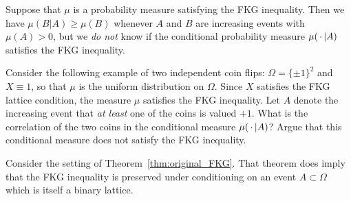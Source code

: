 \begin{remark}
    Suppose that $\mu$ is a probability measure satisfying the FKG inequality.
    Then we have $\mu(B|A)\geq\mu(B)$ whenever $A$ and $B$ are increasing events
    with $\mu(A)>0$,
    but we \emph{do not} know if the conditional probability measure $\mu(\,\cdot\,|A)$
    satisfies the FKG inequality.
\end{remark}

\begin{exercise}
    Consider the following example of two independent coin flips:
    $\Omega=\{\pm1\}^2$ and $X\equiv 1$,
    so that $\mu$ is the uniform distribution on $\Omega$.
    Since $X$ satisfies the FKG lattice condition,
    the measure $\mu$ satisfies the FKG inequality.
    Let $A$ denote the increasing event that \emph{at least}
    one of the coins is valued $+1$.
    What is the correlation of the two coins in the conditional measure
    $\mu(\,\cdot\,|A)$?
    Argue that this conditional measure does not satisfy the FKG inequality.
\end{exercise}

\begin{remark}
    Consider the setting of Theorem~\ref{thm:original_FKG}.
    That theorem does imply that the FKG inequality is preserved
    under conditioning on an event $A\subset\Omega$
    which is itself a binary lattice.
\end{remark}
